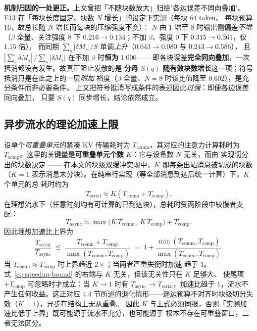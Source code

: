\textbf{机制归因的一处更正。}上文曾把「不随块数放大」归给"各边误差不同向叠加"。
E13 在「每块长度固定、块数 $N$ 增长」的设定下实测（每块 $64$ token、
每块预算 $16$，故总长随 $N$ 增长而每块的压缩强度不变）：
$N$ 由 $1$ 增至 $8$ 时输出侧偏差\emph{不增}（$\beta$ 全量、关注强度 $8$ 下
$0.216\to0.134$；不加 $\beta$、强度 $0$ 下 $0.315\to0.361$，仅 $1.15$ 倍），
而同期 $\sum_s|\delta M_s|/S$ 单调\emph{上升}（$0.043\to0.080$ 与 $0.243\to0.586$），
且 $|\sum_s\delta M_s|\,/\sum_s|\delta M_s|$ 在不加 $\beta$ 时\textbf{恒为} $1.000$——
即各块误差\textbf{完全同向叠加}，一次抵消都没有发生。故真正阻止发散的是
\textbf{分母 $S(q)$ 随有效块数增长}这一项；符号抵消只是在此之上的一层\emph{附加}
裕度（$\beta$ 全量、$N=8$ 时该比值降至 $0.602$），是充分条件而非必要条件。
上文把符号抵消写成条件的表述因此\emph{过强}：即便各边误差同向叠加，
只要 $S(q)$ 同步增长，结论依然成立。

\subsection{异步流水的理论加速上限}
\label{sec:analysis-async}

设单个\emph{可重叠单元}的紧凑 KV 传输耗时为 $T_{\text{comm}}$，其对应的注意力计算耗时为
$T_{\text{comp}}$。这里的关键量是\textbf{可重叠单元个数} $K$：它与设备数 $N$ 无关，而由
实现切分出的块数决定 —— 在本文的块级双缓冲实现中，$K$ 即每条出站消息被切成的块数
（$K=1$ 表示消息未分块）。在纯串行实现（等全部消息到达后统一计算）下，$K$ 个单元的总
耗时约为
\begin{equation}
\label{eq:serial-time}
T_{\text{serial}} \approx K\left( T_{\text{comm}} + T_{\text{comp}} \right).
\end{equation}
在理想流水下（任意时刻均有可计算的已到达块），总耗时受两阶段中较慢者支配：
\begin{equation}
\label{eq:pipeline-time}
T_{\text{async}} \approx \max \Big( K\, T_{\text{comm}},\; K\, T_{\text{comp}} \Big)
+ T_{\text{comp}} .
\end{equation}
因此理想加速比上界为
\begin{equation}
\label{eq:speedup-bound}
\frac{T_{\text{serial}}}{T_{\text{async}}}
\;\lesssim\;
\frac{T_{\text{comm}} + T_{\text{comp}}}{\max(T_{\text{comm}}, T_{\text{comp}})}
\;=\; 1 + \frac{\min(T_{\text{comm}}, T_{\text{comp}})}{\max(T_{\text{comm}}, T_{\text{comp}})} .
\end{equation}
当 $T_{\text{comm}} \approx T_{\text{comp}}$ 时上界趋近 $2\times$；当两者严重失衡时加速
趋于 $1$。式~\eqref{eq:speedup-bound} 的右端与 $K$ 无关，但该无关性只在 $K$ 足够大、
使尾项 $+T_{\text{comp}}$ 可忽略时才成立：当 $K \to 1$ 时有
$T_{\text{async}} \to T_{\text{serial}}$，加速比趋于 $1$，流水不产生任何收益。这正对应
4.4 节所述的退化情形——逐边预算不对齐时块级切分失效（$K=1$），异步在结构上无从重叠。
因此 $K$ 与上式必须同报，否则「实测加速比低于上界」既可能源于流水不充分，也可能源于
根本不存在可重叠窗口，二者无法区分。

